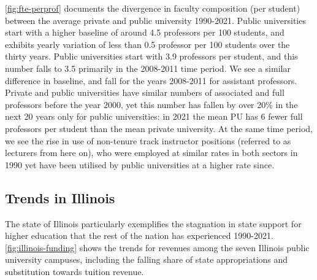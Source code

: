\documentclass[notitlepage,12pt]{article}
\begin{document}
\autoref{fig:fte-perprof} documents the divergence in faculty composition (per student) between the average private and public university 1990-2021.
Public universities start with  a higher baseline of around 4.5 professors per 100 students, and exhibits yearly variation of less than 0.5 professor per 100 students over the thirty years.
Public universities start with 3.9 professors per student, and this number falls to 3.5 primarily in the 2008-2011 time period.
We see a similar difference in baseline, and fall for the years 2008-2011 for assistant professors.
Private and public universities have similar numbers of associated and full professors before the year 2000, yet this number has fallen by over 20\% in the next 20 years only for public universities: in 2021 the mean PU has 6 fewer full professors per student than the mean private university.
At the same time period, we see the rise in use of non-tenure track instructor positions (referred to as lecturers from here on), who were employed at similar rates in both sectors in 1990 yet have been utilised by public universities at a higher rate since.

\subsection{Trends in Illinois}
\label{sec:trends-illinois}

The state of Illinois particularly exemplifies the stagnation in state support for higher education that the rest of the nation has experienced 1990-2021.
\autoref{fig:illinois-funding} shows the trends for revenues among the seven Illinois public university campuses, including the falling share of state appropriations and substitution towards tuition revenue.
\end{document}
